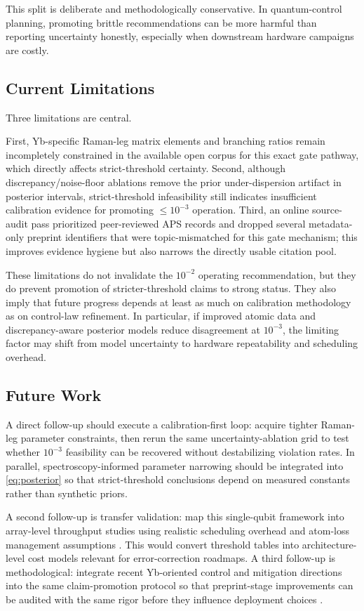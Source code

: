 \documentclass{article} %
\begin{document}
This split is deliberate and methodologically conservative. In quantum-control planning, promoting brittle recommendations can be more harmful than reporting uncertainty honestly, especially when downstream hardware campaigns are costly.

\subsection{Current Limitations}
Three limitations are central.

First, Yb-specific Raman-leg matrix elements and branching ratios remain incompletely constrained in the available open corpus for this exact gate pathway, which directly affects strict-threshold certainty. Second, although discrepancy/noise-floor ablations remove the prior under-dispersion artifact in posterior intervals, strict-threshold infeasibility still indicates insufficient calibration evidence for promoting $\le 10^{-3}$ operation. Third, an online source-audit pass prioritized peer-reviewed APS records and dropped several metadata-only preprint identifiers that were topic-mismatched for this gate mechanism; this improves evidence hygiene but also narrows the directly usable citation pool.

These limitations do not invalidate the $10^{-2}$ operating recommendation, but they do prevent promotion of stricter-threshold claims to strong status. They also imply that future progress depends at least as much on calibration methodology as on control-law refinement. In particular, if improved atomic data and discrepancy-aware posterior models reduce disagreement at $10^{-3}$, the limiting factor may shift from model uncertainty to hardware repeatability and scheduling overhead.

\subsection{Future Work}
A direct follow-up should execute a calibration-first loop: acquire tighter Raman-leg parameter constraints, then rerun the same uncertainty-ablation grid to test whether $10^{-3}$ feasibility can be recovered without destabilizing violation rates. In parallel, spectroscopy-informed parameter narrowing should be integrated into \eqref{eq:posterior} so that strict-threshold conclusions depend on measured constants rather than synthetic priors.

A second follow-up is transfer validation: map this single-qubit framework into array-level throughput studies using realistic scheduling overhead and atom-loss management assumptions \citep{S20,S21}. This would convert threshold tables into architecture-level cost models relevant for error-correction roadmaps. A third follow-up is methodological: integrate recent Yb-oriented control and mitigation directions into the same claim-promotion protocol so that preprint-stage improvements can be audited with the same rigor before they influence deployment choices \citep{S23,S25,S29,S34}.
\end{document}
